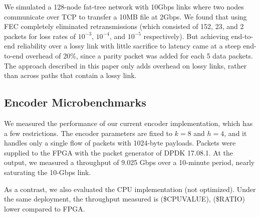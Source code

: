 We simulated a 128-node fat-tree network with 10Gbps links where two
nodes communicate over TCP to transfer a 10MB file at 2Gbps. We found
that using FEC completely eliminated retransmissions (which consisted
  of 152, 23, and 2 packets for loss rates of $10^{-3}$, $10^{-4}$,
and $10^{-5}$ respectively). But achieving end-to-end reliability
over a lossy link with little sacrifice to latency came at a steep
end-to-end overhead of 20\%, since a parity packet was added for each
5 data packets. The approach described in this paper only adds
overhead on lossy links, rather than across paths that contain a
lossy link.


\subsection{Encoder Microbenchmarks}
\iffalse
Here we evaluate the implementation directly, not using a model.
Latency and throughput graphs for experiments involving different loss rates, and the encoder working on the CPU and FPGA.
Note: we have not optimized the CPU implementation.
\fi
We measured the performance of our current encoder implementation, which has a
few restrictions.  The encoder parameters are fixed to $k = 8$ and $h = 4$,
and it handles only a single flow of packets with 1024-byte payloads.
Packets were supplied to the FPGA with the packet generator of DPDK 17.08.1.
At the output, we measured a throughput of 9.025 Gbps over a 10-minute period,
nearly saturating the 10-Gbps link.

\iffalse
To ensure \OurSys's effect observed in the model are practical, we directly measured the 
full throughput of our encoder implementation in FPGA. For our benchmark, the encoder is configured to use
k=8 and h=4. Packets are generated by a tool based
on DPDK library, and are fed to the board (as is specified above~(\S\ref{sec:implementation})) through
a 10Gbps link. The average outgoing throughput measured during a 10 minutes test is 9.025Gbps.
Considering the overhead from other parts of the system, we believe the link is actually close
to being saturated, which is our basic assumption in evaluations.
\fi

As a contrast, we also evaluated the CPU implementation (not optimized). Under the same deployment, the throughput measured is 
(\$CPUVALUE), (\$RATIO) lower compared to FPGA.
 


